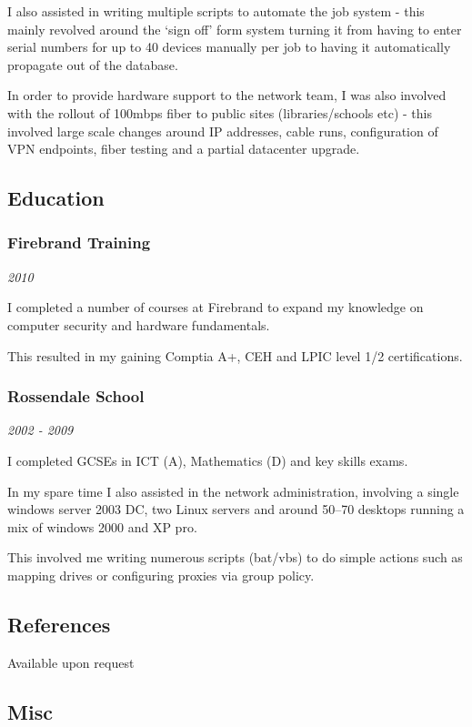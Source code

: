 I also assisted in writing multiple scripts to automate the job system -
this mainly revolved around the `sign off' form system turning it from
having to enter serial numbers for up to 40 devices manually per job to
having it automatically propagate out of the database.

In order to provide hardware support to the network team, I was also
involved with the rollout of 100mbps fiber to public sites
(libraries/schools etc) - this involved large scale changes around IP
addresses, cable runs, configuration of VPN endpoints, fiber testing and
a partial datacenter upgrade.

\subsection{Education}

\subsubsection{Firebrand Training}

\emph{2010}

I completed a number of courses at Firebrand to expand my knowledge on
computer security and hardware fundamentals.

This resulted in my gaining Comptia A+, CEH and LPIC level 1/2
certifications.

\subsubsection{Rossendale School}

\emph{2002 - 2009}

I completed GCSEs in ICT (A), Mathematics (D) and key skills exams.

In my spare time I also assisted in the network administration,
involving a single windows server 2003 DC, two Linux servers and around
50--70 desktops running a mix of windows 2000 and XP pro.

This involved me writing numerous scripts (bat/vbs) to do simple actions
such as mapping drives or configuring proxies via group policy.

\subsection{References}

Available upon request

\subsection{Misc}

